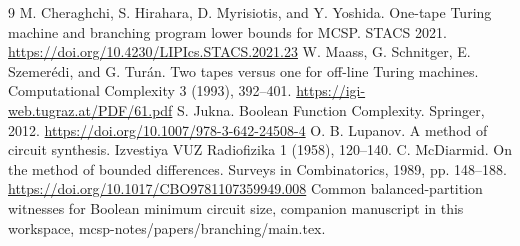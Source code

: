 \documentclass[11pt]{article}
\begin{document}
\begin{thebibliography}{9}
 M. Cheraghchi, S. Hirahara, D. Myrisiotis, and Y. Yoshida. One-tape Turing machine and branching program lower bounds for MCSP. STACS 2021. \url{https://doi.org/10.4230/LIPIcs.STACS.2021.23}
 W. Maass, G. Schnitger, E. Szemer\'edi, and G. Tur\'an. Two tapes versus one for off-line Turing machines. Computational Complexity 3 (1993), 392--401. \url{https://igi-web.tugraz.at/PDF/61.pdf}
 S. Jukna. Boolean Function Complexity. Springer, 2012. \url{https://doi.org/10.1007/978-3-642-24508-4}
 O. B. Lupanov. A method of circuit synthesis. Izvestiya VUZ Radiofizika 1 (1958), 120--140.
 C. McDiarmid. On the method of bounded differences. Surveys in Combinatorics, 1989, pp. 148--188. \url{https://doi.org/10.1017/CBO9781107359949.008}
 Common balanced-partition witnesses for Boolean minimum circuit size, companion manuscript in this workspace, \textrm{mcsp-notes/papers/branching/main.tex}.
\end{thebibliography}
\end{document}
